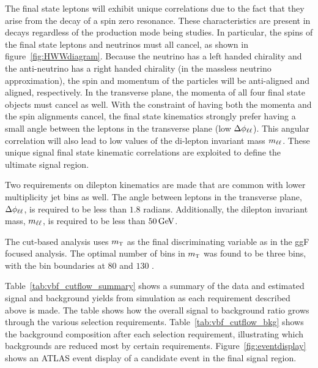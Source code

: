 The final state leptons will exhibit unique correlations due to the fact that they arise from the decay of a spin zero resonance. These characteristics are present in \HWWfull decays regardless of the production mode being studies. In particular, the spins of the final state leptons and neutrinos must all cancel, as shown in figure~\ref{fig:HWWdiagram}. Because the neutrino has a left handed
chirality and the anti-neutrino has a right handed chirality (in the massless neutrino approximation), the spin and momentum of the particles will be anti-aligned and aligned, respectively. In the transverse plane, the momenta of all four final state objects must cancel as well. With the constraint of having both the momenta and the spin alignments cancel, the final state kinematics strongly prefer having a small angle between the leptons in the transverse plane (low $\Delta\phi_{\ell\ell}$). This angular correlation will also lead to low values of the di-lepton invariant mass $m_{\ell\ell}$. These unique signal final state kinematic correlations are exploited to define the ultimate signal region. 

Two requirements on dilepton kinematics are made that are common with lower multiplicity jet bins as well. The angle between leptons in the transverse plane, $\Delta\phi_{\ell\ell}$, is required to be less than $1.8$ radians. Additionally, the dilepton invariant mass, $m_{\ell\ell}$, is required to be less than $50 \GeV$. 

The cut-based analysis uses $m_{\textrm{\footnotesize\sc t}}$ as the final discriminating variable as in the ggF focused analysis. The optimal number of bins in $m_{\textrm{\footnotesize\sc t}}$ was found to be three bins, with the bin boundaries at $80$ and $130$ \GeV. 

Table~\ref{tab:vbf_cutflow_summary} shows a summary of the data and estimated signal and background yields from simulation as each requirement described above is made. The table shows how the overall signal to background ratio grows through the various selection requirements. Table~\ref{tab:vbf_cutflow_bkg} shows the background composition after each selection requirement, illustrating which backgrounds are reduced most by certain requirements. Figure~\ref{fig:eventdisplay} shows an ATLAS event display of a candidate event in the final signal region. 


